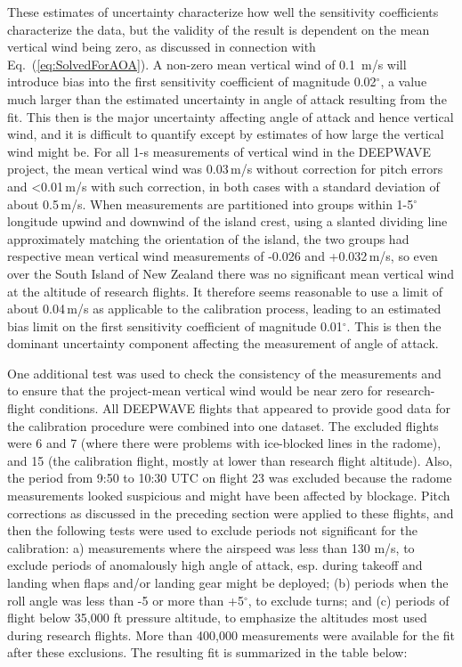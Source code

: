 \documentclass[12pt,twoside,english]{article}\usepackage[]{graphicx}\usepackage[]{color}
\let\OrgIndex\index
\renewcommand*{\index}[1]{\OrgIndex{#1}}
\begin{document}
These estimates of uncertainty characterize how well the sensitivity coefficients characterize the data, but the validity of the result is dependent on the mean vertical wind being zero, as discussed in connection with Eq.~(\ref{eq:SolvedForAOA}). A non-zero mean vertical wind of 0.1~m/s will introduce bias into the first sensitivity coefficient of magnitude 0.02$^{\circ}$, a value much larger than the estimated uncertainty in angle of attack resulting from the fit. This then is the major uncertainty affecting angle of attack and hence vertical wind, and it is difficult to quantify except by estimates of how large the vertical wind might be. For all 1-s measurements of vertical wind in the DEEPWAVE project, the mean vertical wind was 0.03\,m/s without correction for pitch errors and <0.01\,m/s with such correction, in both cases with a standard deviation of about 0.5\,m/s. When measurements are partitioned into groups within 1-5$^{\circ}$ longitude upwind and downwind of the island crest, using a slanted dividing line approximately matching the orientation of the island, the two groups had respective mean vertical wind measurements of -0.026 and +0.032\,m/s, so even over the South Island of New Zealand there was no significant mean vertical wind at the altitude of research flights. It therefore seems reasonable to use a limit of about 0.04\,m/s as applicable to the calibration process, leading to an estimated bias limit on the first sensitivity coefficient of magnitude 0.01$^{\circ}$. This is then the dominant uncertainty component affecting the measurement of angle of attack. 

One additional test was used to check the consistency of the measurements and to ensure that the project-mean vertical wind would be near zero for research-flight conditions. All DEEPWAVE flights that appeared to provide good data for the calibration procedure were combined into one dataset. The excluded flights were 6 and 7 (where there were problems with ice-blocked lines in the radome), and 15 (the calibration flight, mostly at lower than research flight altitude). Also, the period from 9:50 to 10:30 UTC on flight 23 was excluded because the radome measurements looked suspicious and might have been affected by blockage. Pitch corrections as discussed in the preceding section were applied to these flights, and then the following tests were used to exclude periods not significant for the calibration: a) measurements where the airspeed was less than 130 m/s, to exclude periods of anomalously high angle of attack, esp. during takeoff and landing when flaps and/or landing gear might be deployed; (b) periods when the roll angle was less than -5 or more than +5$^{\circ}$, to exclude turns; and (c) periods of flight below 35,000 ft pressure altitude, to emphasize the altitudes most used during research flights. More than 400,000 measurements were available for the fit after these exclusions. The resulting fit is summarized in the table below:
\end{document}
